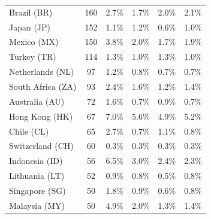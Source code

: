 {\begin{table}[ht]
{\begin{tabular}{lccccc}
Brazil (BR)           &   160  & 2.7\% & 1.7\% & 2.0\% & 2.1\% \\  %
Japan (JP)            &   152  & 1.1\% & 1.2\% & 0.6\% & 1.0\% \\  %
Mexico (MX)           &   150  & \cellcolor{red0} 3.8\% & 2.0\% & 1.7\% & 1.9\% \\  %
Turkey (TR)           &   114  & 1.3\% & 1.0\% & 1.3\% & 1.0\% \\  %
Netherlands (NL)      &    97  & 1.2\% & 0.8\% & 0.7\% & 0.7\% \\  %
South Africa (ZA)     &    93  & 2.4\% & 1.6\% & 1.2\% & 1.4\% \\  %
Australia (AU)        &    72  & 1.6\% & 0.7\% & 0.9\% & 0.7\% \\  %
Hong Kong (HK)        &    67  & \cellcolor{red0} 7.0\% & 5.6\% & 4.9\% & 5.2\% \\  %
Chile (CL)            &    65  & \cellcolor{red1} 2.7\% & \cellcolor{green0} 0.7\% & 1.1\% & \cellcolor{green0} 0.8\% \\  %
Switzerland (CH)      &    60  & 0.3\% & 0.3\% & 0.3\% & 0.3\% \\  %
Indonesia (ID)        &    56  & \cellcolor{red0} 6.5\% & 3.0\% & 2.4\% & 2.3\% \\  %
Lithuania (LT)        &    52  & 0.9\% & 0.8\% & 0.5\% & 0.8\% \\  %
Singapore (SG)        &    50  & \cellcolor{red0} 1.8\% & 0.9\% & \cellcolor{green0} 0.6\% & 0.8\% \\  %
Malaysia (MY)         &    50  & \cellcolor{red1} 4.9\% & 2.0\% & \cellcolor{green0} 1.3\% & \cellcolor{green0} 1.4\% \\  %




\end{tabular}}
\end{table}}
